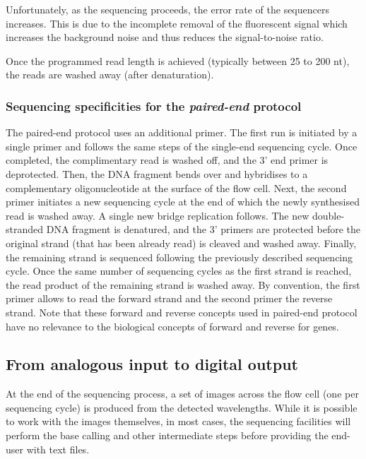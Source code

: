 Unfortunately, as the sequencing proceeds, the error rate of the sequencers
increases. This is due to the incomplete removal of the fluorescent signal which
increases the background noise and thus reduces the signal-to-noise ratio.\mybr\

Once the programmed read length is achieved (typically between 25 to 200 \gls{nt}),
the reads are washed away (after denaturation).\mybr\

\subsubsection{Sequencing specificities for the \emph{paired-end} protocol}

The paired-end protocol uses an additional primer.
The first run is initiated by a single primer and
follows the same steps of the single-end sequencing cycle.
Once completed, the complimentary read is washed off,
and the 3' end primer is deprotected.
Then, the \gls{DNA} fragment bends over and hybridises to a complementary
oligonucleotide at the surface of the flow cell.
Next, the second primer initiates a new sequencing cycle
at the end of which the newly synthesised read is washed away.
A single new bridge replication follows.
The new double-stranded \gls{DNA} fragment is denatured, and the 3' primers are
protected before the original strand (that has been already read)
is cleaved and washed away.
Finally, the remaining strand is sequenced following the previously described
sequencing cycle. Once the same number of sequencing cycles as the first
strand is reached, the read product of the remaining strand is washed away.
By convention, the first primer allows to read the forward strand
and the second primer the reverse strand.
Note that these forward and reverse concepts used in paired-end protocol have
no relevance to the biological concepts of forward and reverse for genes.\mybr\

\subsection{From analogous input to digital output}

At the end of the sequencing process, a set of images across the flow cell
(one per sequencing cycle) is produced from the detected wavelengths.
While it is possible to work with the images themselves, in most
cases, the sequencing facilities will perform the base calling
and other intermediate steps before providing the end-user with text files.\mybr\

